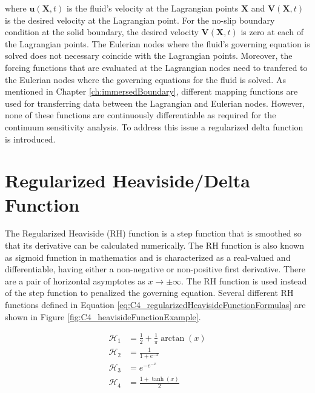 where $\mathbf{u}(\mathbf{X}, t)$ is the fluid's velocity at the Lagrangian points $\mathbf{X}$ and $\mathbf{V}(\mathbf{X}, t)$ is the desired velocity at the Lagrangian point. For the no-slip boundary condition at the solid boundary, the desired velocity $\mathbf{V}(\mathbf{X}, t)$ is zero at each of the Lagrangian points. The Eulerian nodes where the fluid's governing equation is solved does not necessary coincide with the Lagrangian points. Moreover, the forcing functions that are evaluated at the Lagrangian nodes need to tranfered to the Eulerian nodes where the governing equations for the fluid is solved. As mentioned in Chapter \ref{ch:immersedBoundary}, different mapping functions are used for transferring data between the Lagrangian and Eulerian nodes. However, none of these functions are continuously differentiable as required for the continuum sensitivity analysis. To address this issue a regularized delta function is introduced.

\section{Regularized Heaviside/Delta Function}
The Regularized Heaviside (RH) function is a step function that is smoothed so that its derivative can be calculated numerically. The RH function is also known as sigmoid function in mathematics and is characterized as a real-valued and differentiable, having either a non-negative or non-positive first derivative. There are a pair of horizontal asymptotes as $x \rightarrow \pm \infty$. The RH function is used instead of the step function to penalized the governing equation.  Several different RH functions defined in Equation \eqref{eq:C4_regularizedHeavisideFunctionFormulas} are shown in Figure \ref{fig:C4_heavisideFunctionExample}.

\begin{subequations}\label{eq:C4_regularizedHeavisideFunctionFormulas}
\begin{align}
	\mathcal{H}_1 &= \frac{1}{2} + \frac{1}{\pi} \arctan \left( x \right) \\
	\mathcal{H}_2 &= \frac{1}{1 + e^{-x}} \\
	\mathcal{H}_3 &= e^{-e^{-x}} \\
	\mathcal{H}_4 &= \frac{1 + \tanh(x)}{2}
\end{align}
\end{subequations}

